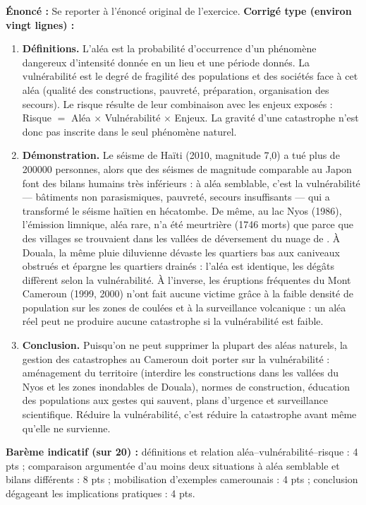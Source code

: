 \documentclass[11pt]{article}
\newcommand{\cle}[1]{{\popxbold\color{popdark}#1}}
\begin{document}
\begin{corrige}
\textbf{Énoncé :} Se reporter à l'énoncé original de l'exercice.
\tcblower
\textbf{Corrigé type (environ vingt lignes) :}

\begin{enumerate}
\item \textbf{Définitions.} L'\cle{aléa} est la probabilité d'occurrence d'un phénomène dangereux d'intensité donnée en un lieu et une période donnés. La \cle{vulnérabilité} est le degré de fragilité des populations et des sociétés face à cet aléa (qualité des constructions, pauvreté, préparation, organisation des secours). Le \cle{risque} résulte de leur combinaison avec les enjeux exposés : Risque $=$ Aléa $\times$ Vulnérabilité $\times$ Enjeux. La gravité d'une catastrophe n'est donc pas inscrite dans le seul phénomène naturel.
\item \textbf{Démonstration.} Le séisme de Haïti (2010, magnitude 7,0) a tué plus de \num{200000} personnes, alors que des séismes de magnitude comparable au Japon font des bilans humains très inférieurs : à aléa semblable, c'est la vulnérabilité — bâtiments non parasismiques, pauvreté, secours insuffisants — qui a transformé le séisme haïtien en hécatombe. De même, au lac Nyos (1986), l'émission limnique, aléa rare, n'a été meurtrière (\num{1746} morts) que parce que des villages se trouvaient dans les vallées de déversement du nuage de . À Douala, la même pluie diluvienne dévaste les quartiers bas aux caniveaux obstrués et épargne les quartiers drainés : l'aléa est identique, les dégâts diffèrent selon la vulnérabilité. À l'inverse, les éruptions fréquentes du Mont Cameroun (1999, 2000) n'ont fait aucune victime grâce à la faible densité de population sur les zones de coulées et à la surveillance volcanique : un aléa réel peut ne produire aucune catastrophe si la vulnérabilité est faible.
\item \textbf{Conclusion.} Puisqu'on ne peut supprimer la plupart des aléas naturels, la gestion des catastrophes au Cameroun doit porter sur la vulnérabilité : aménagement du territoire (interdire les constructions dans les vallées du Nyos et les zones inondables de Douala), normes de construction, éducation des populations aux gestes qui sauvent, plans d'urgence et surveillance scientifique. Réduire la vulnérabilité, c'est réduire la catastrophe avant même qu'elle ne survienne.
\end{enumerate}
\textbf{Barème indicatif (sur 20) :} définitions et relation aléa--vulnérabilité--risque : 4 pts ; comparaison argumentée d'au moins deux situations à aléa semblable et bilans différents : 8 pts ; mobilisation d'exemples camerounais : 4 pts ; conclusion dégageant les implications pratiques : 4 pts.


\end{corrige}
\end{document}
